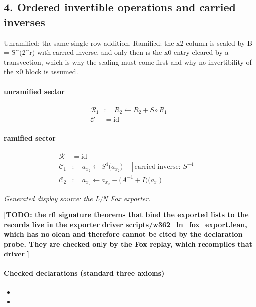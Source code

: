 \subsection*{4. Ordered invertible operations and carried inverses}
Unramified: the same single row addition. Ramified: the x2 column is scaled by B = S\textasciicircum{}(2\textasciicircum{}r) with carried inverse, and only then is the x0 entry cleared by a transvection, which is why the scaling must come first and why no invertibility of the x0 block is assumed.

\paragraph{unramified sector}
\[\begin{aligned}\mathcal R_{1}&:\quad R_2\leftarrow R_2+S\circ R_1\\\mathcal C&=\mathrm{id}\end{aligned}\]
\paragraph{ramified sector}
\[\begin{aligned}\mathcal R&=\mathrm{id}\\\mathcal C_{1}&:\quad a_{x_{2}}\leftarrow S^{4}\bigl(a_{x_{2}}\bigr)\quad[\text{carried inverse: }S^{-4}]\\\mathcal C_{2}&:\quad a_{x_{2}}\leftarrow a_{x_{2}}-\bigl(A^{-1}+I\bigr)\bigl(a_{x_{0}}\bigr)\end{aligned}\]
\par\noindent\emph{Generated display source: the L/N Fox exporter.}
\par\noindent\textbf{[TODO: the rfl signature theorems that bind the exported lists to the records live in the exporter driver scripts/w362\_ln\_fox\_export.lean, which has no olean and therefore cannot be cited by the declaration probe. They are checked only by the Fox replay, which recompiles that driver.]}
\paragraph{Checked declarations (standard three axioms)}
\begin{itemize}
\item {}
\item {}
\end{itemize}

